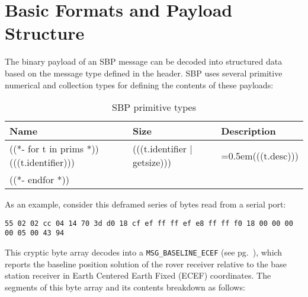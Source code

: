 \documentclass{article}
\numberwithin{table}{subsection}
\numberwithin{field}{subsection}
\begin{document}
\section{Basic Formats and Payload Structure}
\label{sec:Payload}
\begin{large}
The binary payload of an SBP message can be decoded into structured
data based on the message type defined in the header. SBP uses several
primitive numerical and collection types for defining the contents of
these payloads:
\end{large}
\begin{table}[h]
  \centering
  \begin{tabularx}{0.80\textwidth}{aaX}
    \toprule
    Name & Size & Description \\
    \midrule
    ((*- for t in prims *))
    (((t.identifier))) & (((t.identifier | getsize))) & \hangindent=0.5em{(((t.desc)))} \\
    ((*- endfor *))
    \bottomrule
  \end{tabularx}
  \caption{SBP primitive types}
  \label{tab:types}
\end{table}
\begin{large}
 \par As an example, consider this deframed series of bytes read
from a serial port:
\begin{verbatim}
55 02 02 cc 04 14 70 3d d0 18 cf ef ff ff ef e8 ff ff f0 18 00 00 00 00 05 00 43 94
\end{verbatim}
This cryptic byte array decodes into a \texttt{MSG\_BASELINE\_ECEF}
(see pg.~\pageref{sec:MSG_POS_ECEF}), which reports the baseline
position solution of the rover receiver relative to the base station
receiver in Earth Centered Earth Fixed (ECEF) coordinates. The
segments of this byte array and its contents breakdown as follows:
\end{large}
\end{document}

